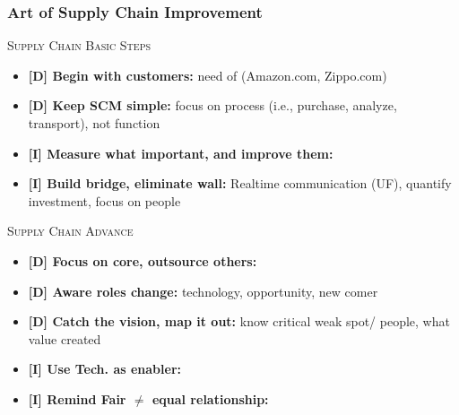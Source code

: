 \documentclass[10pt,handout,notes=show]{beamer}
\begin{document}
\begin{frame}[label=improve]
  \frametitle{Art of Supply Chain Improvement }

    \textsc{Supply Chain Basic Steps}
    \begin{itemize}
      \item \textbf{[D] Begin with customers:} need of  (Amazon.com, Zippo.com)
      \item \textbf{[D] Keep SCM simple:} focus on process (i.e., purchase, analyze, transport), not function
      \item \textbf{[I] Measure what important, and improve them:}
      \item \textbf{[I] Build bridge, eliminate wall:}  Realtime communication (UF), quantify investment, focus on people
    \end{itemize}

    \textsc{Supply Chain Advance}
    \begin{itemize}
      \item \textbf{[D] Focus on core, outsource others:}
      \item \textbf{[D] Aware roles change:} technology, opportunity, new comer
      \item \textbf{[D] Catch the vision, map it out:} know critical weak spot/ people, what value created
      \item \textbf{[I] Use Tech. as enabler:}
      \item \textbf{[I] Remind Fair $\neq$ equal relationship:}
    \end{itemize}

\end{frame}
\end{document}
